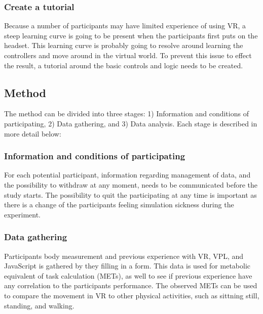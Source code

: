\documentclass{sigchi}
\begin{document}
\subsubsection{Create a tutorial}
Because a number of participants may have limited experience of using VR, a steep learning curve is going to be present when the participants first puts on the headset. This learning curve is probably going to resolve around learning the controllers and move around in the virtual world. To prevent this issue to effect the result, a tutorial around the basic controls and logic needs to be created.

\subsection{Method}
The method can be divided into three stages: 1) Information and conditions of participating, 2) Data gathering, and 3) Data analysis. Each stage is described in more detail below:

\subsubsection{Information and conditions of participating}
For each potential participant, information regarding management of data, and the possibility to withdraw at any moment, needs to be communicated before the study starts. The possibility to quit the participating at any time is important as there is a change of the participants feeling simulation sickness during the experiment.

\subsubsection{Data gathering}
Participants body measurement and previous experience with VR, VPL, and JavaScript is gathered by they filling in a form. This data is used for metabolic equivalent of task calculation (METs), as well to see if previous experience have any correlation to the participants performance. The observed METs can be used to compare the movement in VR to other physical activities, such as sittning still, standing, and walking.
\end{document}
